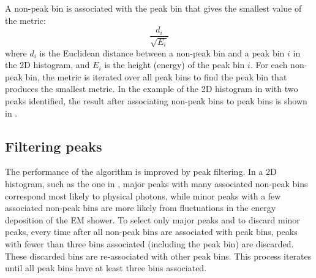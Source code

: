 A non-peak bin is associated with the peak bin that gives the smallest value of the metric:
\begin{equation}
\frac{d_{i}}{\sqrt{E_{i}}}
\end{equation}
where $d_{i}$ is the Euclidean distance between a non-peak bin and a  peak bin $i$ in the 2D histogram, and $E_{i}$ is the height (energy) of the peak bin $i$. For each non-peak bin, the metric is iterated over all peak bins to find the peak bin that produces the smallest metric. In the example of the 2D histogram in  with two peaks identified, the result after associating non-peak bins to peak bins is shown in .



\subsection{Filtering peaks}

The performance of the \peakFinding algorithm is improved by peak filtering. In a 2D histogram, such as the one in , major peaks with many associated non-peak bins correspond most likely  to physical photons, while minor peaks with a few associated non-peak bins are more likely from fluctuations in the energy deposition of the EM shower. To select only major peaks and to discard minor peaks, every time after all non-peak bins are associated with peak bins, peaks with fewer than three bins associated (including the peak bin) are discarded. These discarded bins are re-associated with other peak bins. This  process iterates until all peak bins have at least three bins associated.


